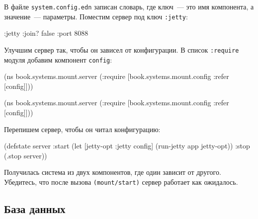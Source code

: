 \fi

В файле \verb|system.config.edn| записан словарь, где ключ~--- это имя компонента, а
значение~--- параметры. Поместим сервер под ключ \verb|:jetty|:

\begin{english}
  \begin{clojure}
{:jetty {:join? false :port 8088}}
  \end{clojure}
\end{english}


Улучшим сервер так, чтобы он зависел от конфигурации. В список \verb|:require|
модуля добавим компонент \verb|config|:

\ifx\DEVICETYPE\MOBILE

\begin{english}
  \begin{clojure}
(ns book.systems.mount.server
 (:require
  [book.systems.mount.config
   :refer [config]]))
  \end{clojure}
\end{english}

\else

\begin{english}
  \begin{clojure}
(ns book.systems.mount.server
 (:require
  [book.systems.mount.config :refer [config]]))
  \end{clojure}
\end{english}

\fi

\noindent
Перепишем сервер, чтобы он читал конфигурацию:

\begin{english}
  \begin{clojure}
(defstate server
  :start
  (let [{jetty-opt :jetty} config]
    (run-jetty app jetty-opt))
  :stop (.stop server))
  \end{clojure}
\end{english}

Получилась система из двух компонентов, где один зависит от другого. Убедитесь,
что после вызова \verb|(mount/start)| сервер работает как ожидалось.

\subsection{База данных}


